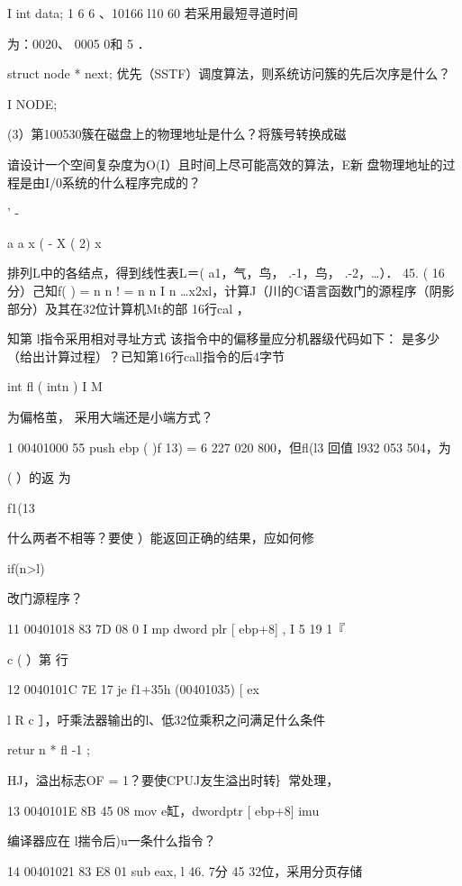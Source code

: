 {    I   int data;    1   6  6    、10166   l10  60  若采用最短寻道时间

    为：0020、 0005    0和    5  ．

    struct node * next;    优先（SSTF）调度算法，则系统访问簇的先后次序是什么？

    I NODE;

    (3）第100530簇在磁盘上的物理地址是什么？将簇号转换成磁

   谙设计一个空间复杂度为O(I）且时间上尽可能高效的算法，E新    盘物理地址的过程是由I/0系统的什么程序完成的？

    ’    -

    a    a    x (  -  X (   2) x

   排列L中的各结点，得到线性表L＝( a1，气，鸟， .-1，鸟， .-2，…）．    45. ( 16分）己知f( ) = n    n !  = n   n  I    n     …x2xl，计算J（川的C语言函数门的源程序（阴影部分）及其在32位计算机Mt的部    16行cal    ，

    知第    l指令采用相对寻址方式 该指令中的偏移量应分机器级代码如下：    是多少（给出计算过程）？已知第16行call指令的后4字节

    int  fl ( intn ) I    M

    为偏格茧，  采用大端还是小端方式？

    1  00401000    55     push  ebp    ( )f 13) = 6 227 020 800，但fl(l3    回值  l932 053 504，为

    (     ）的返    为

    f1(13

    什么两者不相等？要使    ）能返回正确的结果，应如何修

    if(n>l)

    改门源程序？

    11 00401018    83 7D 08 0 I     mp  dword plr [ ebp+8] , I    5    19   1『

    c    ( ）第  行

    12 0040101C    7E 17     je  f1+35h (00401035)     [ ex

    l    R c ］，吁乘法器输出的l、低32位乘积之问满足什么条件

    retur n * fl  -1 ;

    HJ，溢出标志OF = 1？要使CPUJ友生溢出时转｝常处理，

    13 0040101E    8B 45 08     mov  e缸，dwordptr [ ebp+8]    imu

    编译器应在   l揣令后)u一条什么指令？

    14 00401021    83 E8 01     sub  eax, l    46.  7分    45    32位，采用分页存储

}
